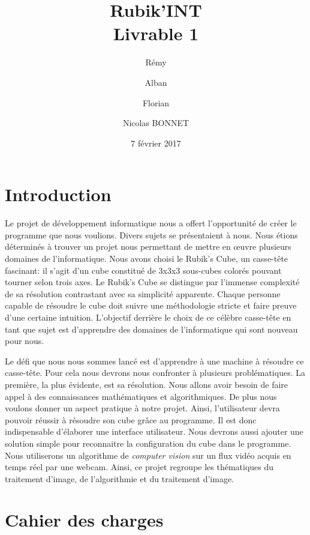 \documentclass[a4paper]{report}
\title{Rubik'INT \\ Livrable 1}
\author{Rémy \bsc{ZIRNHELD} \and Alban \bsc{MANZANO} \and Florian \bsc{GRANTE} \and Nicolas {BONNET}}
\date{7 février 2017}
\begin{document}
\maketitle

\tableofcontents

\chapter*{Introduction}

Le projet de développement informatique nous a offert l'opportunité de créer le programme que nous voulions.
Divers sujets se présentaient à nous. Nous étions déterminés à trouver un projet nous permettant de mettre en œuvre plusieurs domaines de l'informatique.
Nous avons choisi le Rubik's Cube, un casse-tête fascinant: il s'agit d'un cube constitué de 3x3x3 sous-cubes colorés pouvant tourner selon trois axes.
Le Rubik's Cube se distingue par l'immense complexité de sa résolution contrastant avec sa simplicité apparente.
Chaque personne capable de résoudre le cube doit suivre une méthodologie stricte et faire preuve d'une certaine intuition.
L'objectif derrière le choix de ce célèbre casse-tête en tant que sujet est d'apprendre des domaines de l'informatique qui sont nouveau pour nous.

Le défi que nous nous sommes lancé est d'apprendre à une machine à résoudre ce casse-tête.
Pour cela nous devrons nous confronter à plusieurs problématiques.
La première, la plus évidente, est sa résolution. Nous allons avoir besoin de faire appel à des connaissances mathématiques et algorithmiques.
De plus nous voulons donner un aspect pratique à notre projet. Ainsi, l'utilisateur devra pouvoir réussir à résoudre son cube grâce au programme.
Il est donc indispensable d'élaborer une interface utilisateur.
Nous devrons aussi ajouter une solution simple pour reconnaitre la configuration du cube dans le programme. Nous utiliserons un algorithme de \textit{computer vision} sur un flux vidéo acquis en temps réel par une webcam.
Ainsi, ce projet regroupe les thématiques du traitement d'image, de l'algorithmie et du traitement d'image.

\chapter{Cahier des charges}
\end{document}
